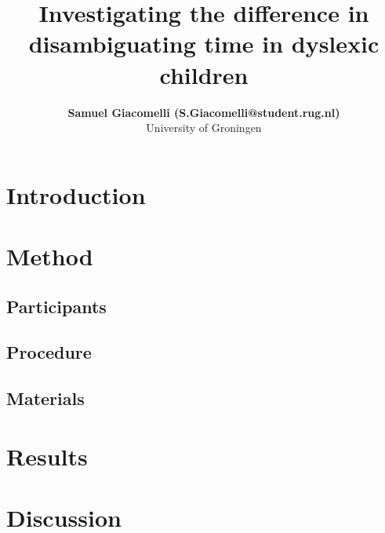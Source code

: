 \documentclass[10pt, a4]{article}
\title{Investigating the difference in disambiguating time in dyslexic children}
\author{{\large \bf Samuel Giacomelli (S.Giacomelli@student.rug.nl)} \\
University of Groningen}
\begin{document}
\maketitle

\begin{abstract}
    
\end{abstract}
\blindtext

\section{Introduction}
\blindtext

\section{Method}

\subsection{Participants}
\blindtext

\subsection{Procedure}
\blindtext

\subsection{Materials}
\blindtext

\section{Results}
\blindtext


\section{Discussion}
\blindtext
    



\setlength{\bibhang}{.125in}
\setlength{\bibindent}{-\bibhang}

\vfill
\pagebreak


\end{document}
